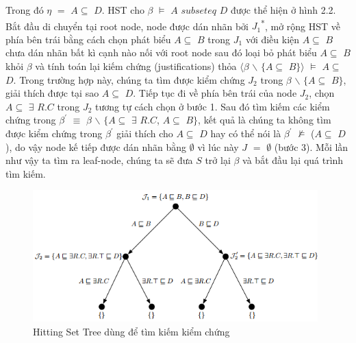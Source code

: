 Trong đó $\eta$ $=$ $A\subseteq$ $D$. HST cho $\beta$ $\models$ $A$ $subseteq$ $D$ được thể hiện ở hình 2.2. Bắt đầu di chuyển tại root node, node được dán nhãn bởi $J_{1}$\textsuperscript{*}, mở rộng HST về phía bên trái bằng cách chọn phát biểu $A\subseteq$ $B$ trong $J_{1}$ với điều kiện $A\subseteq$ $B$ chưa dán nhãn bất kì cạnh nào nối với root node sau đó loại bỏ phát biểu $A\subseteq$ $B$ khỏi $\beta$ và tính toán lại kiếm chứng (justifications) thỏa $\langle\beta$ $\backslash$ $\{A\subseteq$ $B\}\rangle$ $\models$ $A\subseteq$ $D$. Trong trường hợp này, chúng ta tìm được kiểm chứng $J_{2}$ trong $\beta$ $\backslash$ $\{A\subseteq$ $B\}$, giải thích được tại sao $A\subseteq$ $D$. Tiếp tục đi về phía bên trái của node $J_{2}$, chọn $A\subseteq$ $\exists$ $R.C$ trong $J_{2}$ tương tự cách chọn ở bước 1. Sau đó tìm kiếm các kiểm chứng trong $\beta^{'}$ $\equiv$ $\beta$ $\backslash$ $\{A\subseteq$ $\exists$ $R.C$, $A\subseteq$ $B\}$, kết quả là chúng ta không tìm được kiểm chứng trong $\beta^{'}$ giải thích cho $A\subseteq$ $D$ hay có thể nói là $\beta^{'}$ $\not\models$ ($A\subseteq$ $D$), do vậy node kế tiếp được dán nhãn bằng $\emptyset$ vì lúc này $J$ $=$ $\emptyset$ (bước 3). Mỗi lần như vậy ta tìm ra leaf-node, chúng ta sẽ đưa $S$ trở lại $\beta$ và bắt đầu lại quá trình tìm kiếm.
		\begin{figure}[ht!]
			\centering
			\includegraphics[width=110mm]{Figures/fig2.png}
			\caption{Hitting Set Tree dùng để tìm kiếm kiểm chứng \label{overflow}}
		\end{figure}
